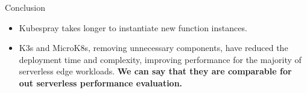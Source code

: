 \begin{frame}{Conclusion}
\begin{itemize}
    \item Kubespray takes longer to instantiate new function instances.
    \item K3s and MicroK8s, removing unnecessary components, have reduced the deployment time and complexity, improving performance for the majority of serverless edge workloads. \pause \textbf{\alert{We can say that they are comparable for out serverless performance evaluation.}}
\end{itemize}
\end{frame}